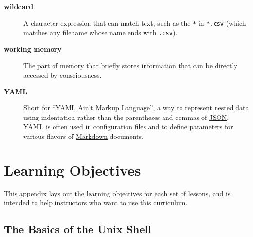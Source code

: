 \documentclass[
]{krantz}
\begin{document}
\begin{description}
\item[\textbf{wildcard}]
A character expression that can match text, such as the \texttt{*} in \texttt{*.csv} (which matches any filename whose name ends with \texttt{.csv}).
\item[\textbf{working memory}]
The part of memory that briefly stores information that can be directly accessed by consciousness.
\item[\textbf{YAML}]
Short for ``YAML Ain't Markup Language'', a way to represent nested data using indentation rather than the parentheses and commas of \protect\hyperlink{json}{JSON}. YAML is often used in configuration files and to define parameters for various flavors of \protect\hyperlink{markdown}{Markdown} documents.
\end{description}

\hypertarget{objectives}{%
\chapter{Learning Objectives}\label{objectives}}

This appendix lays out the learning objectives for each set of lessons,
and is intended to help instructors who want to use this curriculum.

\hypertarget{the-basics-of-the-unix-shell}{%
\section{The Basics of the Unix Shell}\label{the-basics-of-the-unix-shell}}
\end{document}
